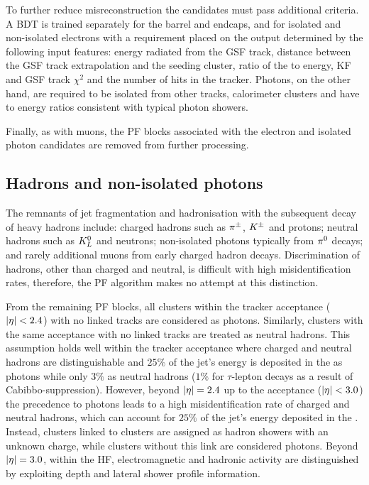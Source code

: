 To further reduce misreconstruction the candidates must pass additional criteria. A BDT is trained separately for the barrel and endcaps, and for isolated and non-isolated electrons with a requirement placed on the output determined by the following input features: energy radiated from the GSF track, distance between the GSF track extrapolation and the \ECAL seeding cluster, ratio of the \HCAL to \ECAL energy, KF and GSF track $\chi^2$ and the number of hits in the tracker. Photons, on the other hand, are required to be isolated from other tracks, calorimeter clusters and have \HCAL to \ECAL energy ratios consistent with typical photon showers.

Finally, as with muons, the PF blocks associated with the electron and isolated photon candidates are removed from further processing.


\subsection{Hadrons and non-isolated photons}

The remnants of jet fragmentation and hadronisation with the subsequent decay of heavy hadrons include: charged hadrons such as $\pi^{\pm}$, $K^{\pm}$ and protons; neutral hadrons such as $K_L^{0}$ and neutrons; non-isolated photons typically from $\pi^{0}$ decays; and rarely additional muons from early charged hadron decays. Discrimination of hadrons, other than charged and neutral, is difficult with high misidentification rates, therefore, the PF algorithm makes no attempt at this distinction.

From the remaining PF blocks, all \ECAL clusters within the tracker acceptance (${|\eta|<2.4}$) with no linked tracks are considered as photons. Similarly, \HCAL clusters with the same acceptance with no linked tracks are treated as neutral hadrons. This assumption holds well within the tracker acceptance where charged and neutral hadrons are distinguishable and $25\%$ of the jet's energy is deposited in the \ECAL as photons while only $3\%$ as neutral hadrons ($1\%$ for $\tau$-lepton decays as a result of Cabibbo-suppression). However, beyond ${|\eta|=2.4}$ up to the \ECAL acceptance (${|\eta|<3.0}$) the precedence to photons leads to a high misidentification rate of charged and neutral hadrons, which can account for $25\%$ of the jet's energy deposited in the \ECAL. Instead, \ECAL clusters linked to \HCAL clusters are assigned as hadron showers with an unknown charge, while \ECAL clusters without this link are considered photons. Beyond ${|\eta|=3.0}$, within the HF, electromagnetic and hadronic activity are distinguished by exploiting depth and lateral shower profile information.

